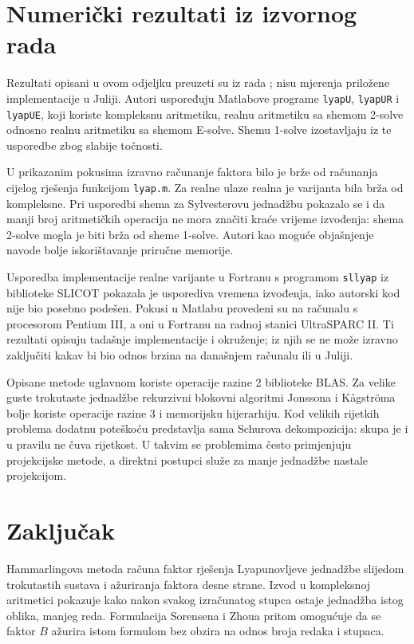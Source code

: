 \documentclass[12pt,a4paper]{article}
\begin{document}
\section{Numerički rezultati iz izvornog rada}

Rezultati opisani u ovom odjeljku preuzeti su iz rada \cite{sorensen}; nisu mjerenja priložene implementacije u Juliji. Autori uspoređuju Matlabove programe \texttt{lyapU}, \texttt{lyapUR} i \texttt{lyapUE}, koji koriste kompleksnu aritmetiku, realnu aritmetiku sa shemom 2-solve odnosno realnu aritmetiku sa shemom E-solve. Shemu 1-solve izostavljaju iz te usporedbe zbog slabije točnosti.

U prikazanim pokusima izravno računanje faktora bilo je brže od računanja cijelog rješenja funkcijom \texttt{lyap.m}. Za realne ulaze realna je varijanta bila brža od kompleksne. Pri usporedbi shema za Sylvesterovu jednadžbu pokazalo se i da manji broj aritmetičkih operacija ne mora značiti kraće vrijeme izvođenja: shema 2-solve mogla je biti brža od sheme 1-solve. Autori kao moguće objašnjenje navode bolje iskorištavanje priručne memorije.

Usporedba implementacije realne varijante u Fortranu s programom \texttt{sllyap} iz biblioteke SLICOT \cite{slicot} pokazala je usporediva vremena izvođenja, iako autorski kod nije bio posebno podešen. Pokusi u Matlabu provedeni su na računalu s procesorom Pentium III, a oni u Fortranu na radnoj stanici UltraSPARC II. Ti rezultati opisuju tadašnje implementacije i okruženje; iz njih se ne može izravno zaključiti kakav bi bio odnos brzina na današnjem računalu ili u Juliji.

Opisane metode uglavnom koriste operacije razine 2 biblioteke BLAS. Za velike guste trokutaste jednadžbe rekurzivni blokovni algoritmi Jonssona i Kågströma \cite{jonsson} bolje koriste operacije razine 3 i memorijsku hijerarhiju. Kod velikih rijetkih problema dodatnu poteškoću predstavlja sama Schurova dekompozicija: skupa je i u pravilu ne čuva rijetkost. U takvim se problemima često primjenjuju projekcijske metode, a direktni postupci služe za manje jednadžbe nastale projekcijom.

\section{Zaključak}

Hammarlingova metoda računa faktor rješenja Lyapunovljeve jednadžbe slijedom trokutastih sustava i ažuriranja faktora desne strane. Izvod u kompleksnoj aritmetici pokazuje kako nakon svakog izračunatog stupca ostaje jednadžba istog oblika, manjeg reda. Formulacija Sorensena i Zhoua pritom omogućuje da se faktor $B$ ažurira istom formulom bez obzira na odnos broja redaka i stupaca.
\end{document}

